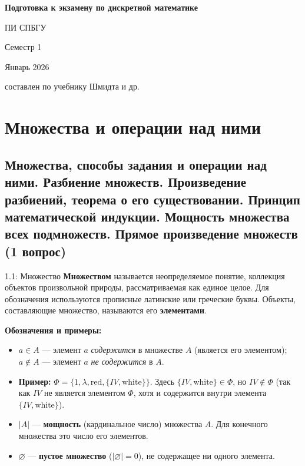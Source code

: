 \documentclass[a4paper,12pt]{article}
\begin{document}
	
	\begin{titlepage}
		\centering
		{\LARGE\bfseries Подготовка к экзамену по дискретной математике\par}
		\vspace{0.5cm}
		{\Large ПИ СПБГУ\par}
		\vspace{0.3cm}
		{\Large Семестр 1\par}
		
		\vspace{2cm}
		
		{\large Январь 2026\par}
		
		\vfill
		
		{\footnotesize составлен по учебнику Шмидта и др.\par}
	\end{titlepage}
	
	\newpage
	\tableofcontents
	
	
	
	
	
\newpage
\section{Множества и операции над ними}

\subsection{Множества, способы задания и операции над ними. Разбиение множеств. Произведение разбиений, теорема о его существовании. Принцип математической индукции. Мощность множества всех подмножеств. Прямое произведение множеств (1 вопрос)}

\begin{definitionbox}{1.1: Множество}
	\textbf{Множеством} называется неопределяемое понятие, коллекция объектов произвольной природы, рассматриваемая как единое целое. Для обозначения используются прописные латинские или греческие буквы. Объекты, составляющие множество, называются его \textbf{элементами}.
\end{definitionbox}

\noindent \textbf{Обозначения и примеры:}
\begin{itemize}
	\item $a \in A$ — элемент $a$ \textit{содержится} в множестве $A$ (является его элементом); $a \notin A$ — элемент $a$ \textit{не содержится} в $A$.
	\item \textbf{Пример:} $\Phi = \{1, \lambda, \text{red}, \{IV, \text{white}\}\}$. Здесь $\{IV, \text{white}\} \in \Phi$, но $IV \notin \Phi$ (так как $IV$ не является элементом $\Phi$, хотя и содержится внутри элемента $\{IV, \text{white}\}$).
	\item $|A|$ — \textbf{мощность} (кардинальное число) множества $A$. Для конечного множества это число его элементов.
	\item $\varnothing$ — \textbf{пустое множество} ($|\varnothing| = 0$), не содержащее ни одного элемента.
\end{itemize}
\end{document}
